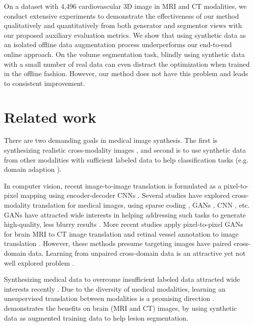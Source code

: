 \documentclass[10pt,twocolumn,letterpaper]{article}
\begin{document}
On a dataset with 4,496 cardiovascular 3D image in MRI and CT modalities, we conduct extensive experiments to demonstrate the effectiveness of our method qualitatively and quantitatively from both generator and segmentor views with our proposed auxiliary evaluation metrics.
We show that using synthetic data as an isolated offline data augmentation process underperforms our end-to-end online approach. 
On the volume segmentation task, blindly using synthetic data with a small number of real data can even distract the optimization when trained in the offline fashion. However, our method does not have this problem and leads to consistent improvement. 



\section{Related work}
There are two demanding goals in medical image synthesis. The first is synthesizing realistic cross-modality images \cite{huang2017simultaneous,nie2016medical}, and second is to use synthetic data from other modalities with sufficient labeled data to help classification tasks (e.g. domain adaption \cite{kamnitsas2017unsupervised}).

In computer vision, recent image-to-image translation is formulated as a pixel-to-pixel mapping using encoder-decoder CNNs  \cite{isola2016image,liu2017unsupervised,zhu2017unpaired,kim2017learning,liu2017unsupervised,xue2017differential,gong2017learning}. 
Several studies have explored cross-modality translation for medical images, using sparse coding \cite{huang2017simultaneous,vemulapalli2015unsupervised}, GANs \cite{nie2016medical,osokin2017gans}, CNN \cite{van2015cross}, etc. GANs have attracted wide interests in helping addressing such tasks to generate high-quality, less blurry results \cite{goodfellow2014generative,arjovsky2017wasserstein,berthelot2017began,zhang2018txt2img}.
More recent studies apply pixel-to-pixel GANs for brain MRI to CT image translation \cite{nie2016medical,kamnitsas2017unsupervised} and retinal vessel annotation to image translation \cite{costa2017towards}. However, these methods presume targeting images have paired cross-domain data. Learning from unpaired cross-domain data is an attractive yet not well explored problem \cite{vemulapalli2015unsupervised,liu2016coupled}.


Synthesizing medical data to overcome insufficient labeled data attracted wide interests recently \cite{shrivastava2016learning,iglesias2013synthesizing,huo2017adversarial}. 
Due to the diversity of medical modalities, learning an unsupervised translation between modalities is a promising direction \cite{costa2017towards}.  
\cite{kamnitsas2017unsupervised} demonstrates the benefits on brain (MRI and CT) images, by using synthetic data as augmented training data to help lesion segmentation. 
\end{document}
